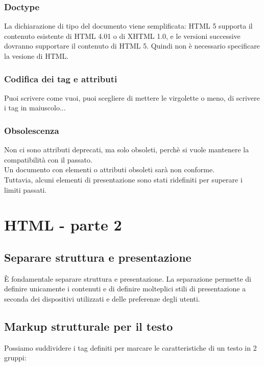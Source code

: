 \documentclass{article}
\begin{document}
\subsubsection{Doctype}
La dichiarazione di tipo del documento viene semplificata: HTML 5 supporta il contenuto esistente di HTML 4.01 o di XHTML 1.0, e le versioni successive dovranno supportare il contenuto di HTML 5. Quindi non è necessario specificare la vesione di HTML.
\subsubsection{Codifica dei tag e attributi}
Puoi scrivere come vuoi, puoi scegliere di mettere le virgolette o meno, di scrivere i tag in maiuscolo...
\subsubsection{Obsolescenza}
Non ci sono attributi deprecati, ma solo obsoleti, perchè si vuole mantenere la compatibilità con il passato.\\
Un documento con elementi o attributi obsoleti sarà non conforme.\\
Tuttavia, alcuni elementi di presentazione sono stati ridefiniti per superare i limiti passati.
\section{HTML - parte 2}
\subsection{Separare struttura e presentazione}
È fondamentale separare struttura e presentazione. La separazione permette di definire unicamente i contenuti e di definire molteplici stili di presentazione a seconda dei dispositivi utilizzati e delle preferenze degli utenti.
\subsection{Markup strutturale per il testo}
Possiamo suddividere i tag definiti per marcare le caratteristiche di un testo in 2 gruppi:
\end{document}
